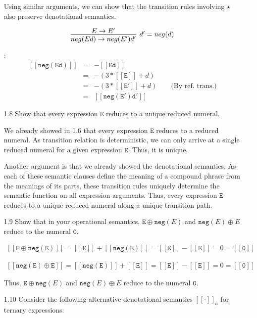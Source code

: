 \documentclass[a4paper,10pt]{article}
\newcommand{\E}{\mathtt{E}}
\newcommand{\negation}{\mathtt{neg}}
\newcommand{\denot}[1]{\mathtt{[[{#1}]]}}
\newcommand{\question}[1]
{\color{DarkBlue}#1 \color{Black} \newline}
\begin{document}
\begin{enumerate}
Using similar arguments, we can show that the transition rules involving $\star$
also preserve denotational semantics.

\[
\infer[d' = neg(d)] 
  {neg(Ed) \rightarrow neg(E')d'}  
  {E \rightarrow E'}    
\]

\proof:
\begin{eqnarray*}
\denot{neg(Ed)}  
            & = & -\denot{Ed}  \\
            & = & -(3 * \denot{E} + d) \\
            & = & -(3 * \denot{E'} + d) \qquad \text{(By ref. trans.)}  \\
            & = & \denot{neg(E')d'}     
\end{eqnarray*}

\question{
\item[1.8] Show that every expression $\E$ reduces to a unique reduced numeral.
}

We already showed in 1.6 that every expression $\E$ reduces to a reduced numeral.
As transition relation is deterministic, we can only arrive at a single reduced
numeral for a given expression $\E$. Thus, it is unique.

Another argument is that we already showed the denotational semantics.
As each of these semantic clauses define the meaning of a compound phrase from 
the meanings of its parts, these transition rules uniquely determine the semantic
function on all expression arguments. Thus, every expression $\E$ reduces to a 
unique reduced numeral along a unique transition path.

\question{
\item[1.9] Show that in your operational semantics, $\E \oplus \negation(E)$ and 
$\negation(E) \oplus E$ reduce to the numeral $\mathtt{0}$.
}

\begin{align}
\denot{E \oplus \negation(E)}
	= \denot{E} + \denot{\negation(E)}
	= \denot{E} - \denot{E}
	= 0	
	= \denot{0}
\end{align}

\begin{align}
\denot{\negation(E) \oplus E}
	= \denot{\negation(E)} + \denot{E}
	= \denot{E} - \denot{E}
	= 0	
	= \denot{0}	
\end{align}

Thus, $\E \oplus \negation(E)$ and $\negation(E) \oplus E$ reduce to the 
numeral $\mathtt{0}$.

\question{
\item[1.10] Consider the following alternative denotational semantics $\denot{\cdot}_a$ for ternary expressions:

}
\end{enumerate}
\end{document}
